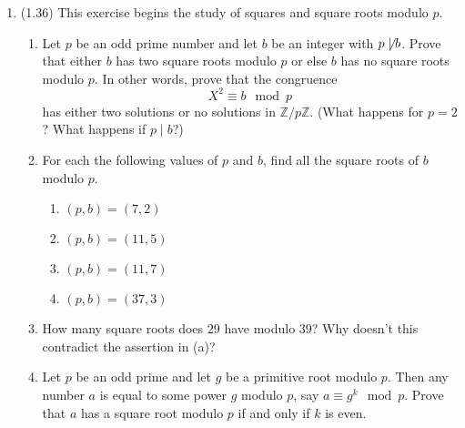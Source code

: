 \documentclass[12pt]{amsart}
\theoremstyle{definition}
\begin{document}
\begin{enumerate}
	\item (1.36) This exercise begins the study of squares and square roots modulo $p$. 
	\begin{enumerate}
		\item Let $p$ be an odd prime number and let $b$ be an integer with $p \not \mid b$. Prove 
			that either $b$ has two square roots modulo $p$ or else $b$ has no square roots 
			modulo $p$. In other words, prove that the congruence 
		\begin{displaymath}
			X^2 \equiv b \mod p
		\end{displaymath}
		has either two solutions or no solutions in $\mathbb{Z}/p\mathbb{Z}$. (What happens for $p=2$? 
		What happens if $p \mid b$?)
	
		\item For each the following values of $p$ and $b$, find all the square roots of $b$ 
			modulo $p$. 
		\begin{enumerate}
			\item $(p,b) = (7,2)$
			\item $(p,b) = (11,5)$
			\item $(p,b) = (11,7)$
			\item $(p,b) = (37,3)$
		\end{enumerate}
		
		\item How many square roots does $29$ have modulo $39$? Why doesn't this contradict the
			assertion in (a)? 

		\item Let $p$ be an odd prime and let $g$ be a primitive root modulo $p$. Then any 
			number $a$ is equal to some power $g$ modulo $p$, say $a \equiv g^k \mod p$. 
			Prove that $a$ has a square root modulo $p$ if and only if $k$ is even. 
	\end{enumerate}
		
\end{enumerate}
\end{document}

